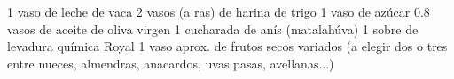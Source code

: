 1 vaso de leche de vaca
2 vasos (a ras) de harina de trigo
1 vaso de azúcar
0.8 vasos de aceite de oliva virgen
1 cucharada de anís (matalahúva)
1 sobre de levadura química Royal
1 vaso aprox. de frutos secos variados (a elegir dos o tres entre nueces, almendras, anacardos, uvas pasas, avellanas...)
